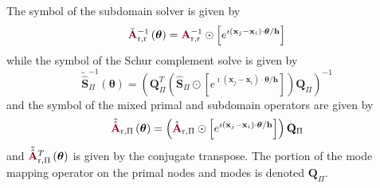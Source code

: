 \begin{definition}
The symbol of the subdomain solver is given by
\begin{equation}
\tilde{\color{burgundy}\mathbf{A}}_{\text{r}, \text{r}}^{-1} \left( \boldsymbol{\theta} \right) = {\color{burgundy}\mathbf{A}}_{\text{r}, \text{r}}^{-1} \odot \left[ e^{\imath \left( \mathbf{x}_j - \mathbf{x}_i \right) \cdot \boldsymbol{\theta} / \mathbf{h}} \right]
\end{equation}
while the symbol of the Schur complement solve is given by
\begin{equation}
\tilde{\hat{\mathbf{S}}}_{\Pi}^{-1} \left( \boldsymbol{\theta} \right) = \left( \mathbf{Q}_{\Pi}^T \left( \hat{\mathbf{S}}_{\Pi} \odot \left[ e^{\imath \left( \mathbf{x}_j - \mathbf{x}_i \right) \cdot \boldsymbol{\theta} / \mathbf{h}} \right] \right) \mathbf{Q}_{\Pi} \right)^{-1}
\end{equation}
and the symbol of the mixed primal and subdomain operators are given by
\begin{equation}
\tilde{\hat{\color{burgundy}\mathbf{A}}}\color{black}_{\text{r}, \Pi} \left( \boldsymbol{\theta} \right) = \left( \hat{\color{burgundy}\mathbf{A}}_{\text{r}, \Pi} \odot \left[ e^{\imath \left( \mathbf{x}_j - \mathbf{x}_i \right) \cdot \boldsymbol{\theta} / \mathbf{h}} \right] \right) \mathbf{Q}_{\Pi}
\end{equation}
and $\tilde{\hat{\color{burgundy}\mathbf{A}}}\color{black}_{\text{r}, \Pi}^T \left( \boldsymbol{\theta} \right)$ is given by the conjugate transpose.
The portion of the mode mapping operator on the primal nodes and modes is denoted $\mathbf{Q}_{\Pi}$.
\label{def:subassembled_symbol}
\end{definition}
